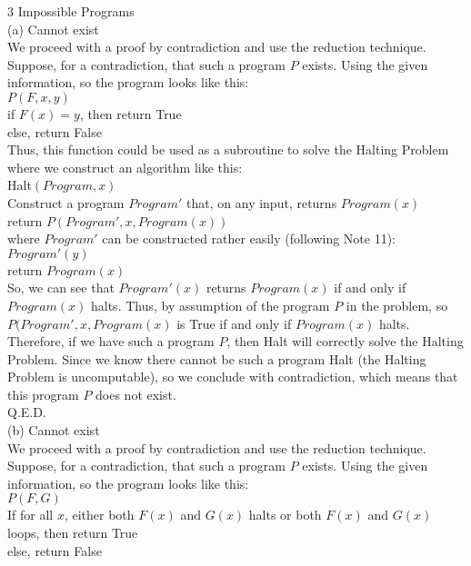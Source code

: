 \documentclass{article}
\begin{document}
{\Large 3 Impossible Programs} \\[.5cm]
(a) Cannot exist \\

We proceed with a proof by contradiction and use the reduction technique. Suppose, for a contradiction, that such a program $P$ exists. Using the given information, so the program looks like this: \\[.2cm]
\indent $P(F, x, y)$ \\[.1cm]
\indent\indent if $F(x) = y$, then return True \\
\indent\indent else, return False \\

Thus, this function could be used as a subroutine to solve the Halting Problem where we construct an algorithm like this: \\[.2cm]
\indent Halt$(Program, x)$ \\[.1cm]
\indent\indent Construct a program $Program'$ that, on any input, returns $Program(x)$ \\
\indent\indent return $P(Program', x, Program(x))$ \\[.3cm]
where $Program'$ can be constructed rather easily (following Note 11): \\[.1cm]
\indent $Program'(y)$ \\[.1cm]
\indent\indent return $Program(x)$ \\

So, we can see that $Program'(x)$ returns $Program(x)$ if and only if $Program(x)$ halts. Thus, by assumption of the program $P$ in the problem, so $P(Program', x, Program(x)$ is True if and only if $Program(x)$ halts. \\

Therefore, if we have such a program $P$, then Halt will correctly solve the Halting Problem. Since we know there cannot be such a program Halt (the Halting Problem is uncomputable), so we conclude with contradiction, which means that this program $P$ does not exist. \\

Q.E.D. \pagebreak\\
(b) Cannot exist \\

We proceed with a proof by contradiction and use the reduction technique. Suppose, for a contradiction, that such a program $P$ exists. Using the given information, so the program looks like this: \\[.2cm]
\indent $P(F, G)$ \\[.1cm]
\indent\indent If for all $x$, either both $F(x)$ and $G(x)$ halts or both $F(x)$ and $G(x)$ loops, then return True \\
\indent\indent else, return False \\
\end{document}
